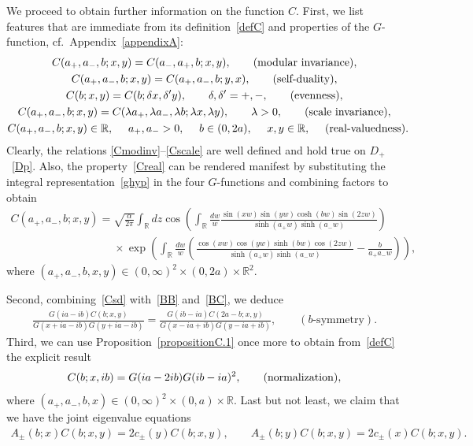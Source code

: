 \documentclass[11pt]{article}
\numberwithin{equation}{section}
\newcommand{\de}{\delta}
\newcommand{\R}{{\mathbb R}}
\newcommand{\aaa}{a_{+},a_{-}}
\begin{document}
We proceed to obtain further information on the function $C$. First, we list features that are immediate from its def\/inition~\eqref{defC} and properties of the $G$-function, cf.~Appendix~\ref{appendixA}:
\begin{gather}\label{Cmodinv}
C(a_{+},a_{-},b;x,y)=C(a_{-},a_{+},b;x,y),\qquad  ({\rm modular\  invariance}),
\\
\label{Csd}
C(a_{+},a_{-},b;x,y)=C(a_{+},a_{-},b;y,x),\qquad  (\mbox{self-duality}),
\\
\label{Ceven}
C(b;x,y)=C(b;\de x, \de'y),\qquad \de,\de'=+,-,\qquad ({\rm evenness}),
\\
\label{Cscale}
C(\aaa,b;x,y)=C(\lambda  a_{+},\lambda a_{-}, \lambda b;\lambda x,\lambda y),\qquad \lambda>0,\qquad ({\rm scale\ invariance}),
\\
\label{Creal}
C(\aaa,b;x,y)\in\R,\!\!\!\!\qquad  \aaa>0,\!\!\!\!\qquad b\in(0,2a),\!\!\!\!\qquad x,y\in\R,\!\!\!\!\qquad \mbox{(real-valuedness)}.\!\!\!\!
\end{gather}
Clearly, the relations \eqref{Cmodinv}--\eqref{Cscale} are well def\/ined and hold true on $D_+$~\eqref{Dp}.  Also, the property~\eqref{Creal} can be rendered manifest by substituting the integral representation~\eqref{ghyp} in the four $G$-functions and combining factors to obtain
\begin{gather}
C(\aaa,b;x,y)=  \sqrt{\frac{\alpha}{2\pi}}  \int_{\R}dz\cos\left( \int_{\R}\frac{dw}{w}\frac{\sin(xw)\sin(yw)\cosh(bw)\sin(2zw)}{\sinh(a_{+}w)\sinh(a_-w)}\right)  \\
\phantom{C(\aaa,b;x,y)=}{}  \times \exp\left( \int_{\R}\frac{dw}{w}\left(\frac{\cos(xw)\cos(yw)\sinh(bw)\cos(2zw)}{\sinh(a_{+}w)\sinh(a_-w)}-\frac{b}{a_+a_-w}\right)\right),  \nonumber
\end{gather}
  where $(\aaa,b,x,y)\in(0,\infty)^2\times(0,2a)\times\R^2$.

Second, combining~\eqref{Csd} with~\eqref{BB} and~\eqref{BC}, we deduce
\begin{gather}\label{Cbsym}
\frac{G(ia-ib)C(b;x,y)}{G(x+ia-ib)G(y+ia-ib)}=
\frac{G(ib-ia)C(2a-b;x,y)}{G(x-ia+ib)G(y-ia+ib)},\qquad (b\mbox{-symmetry}).
\end{gather}
Third, we can use Proposition~\ref{propositionC.1} once more to obtain from~\eqref{defC} the explicit result
\begin{gather}\label{Cnorm}
C(b;x,ib)=G(ia-2ib)G(ib-ia)^2,\qquad ({\rm normalization}),
\end{gather}
where $(\aaa,b,x)\in(0,\infty)^2\times (0,a)\times \R$.
Last but not least, we claim that we have the joint eigenvalue equations
\begin{gather}\label{Cades}
A_{\pm}(b;x)C(b;x,y)=2c_{\pm}(y)C(b;x,y),\qquad A_{\pm}(b;y)C(b;x,y)=2c_{\pm}( x)C(b;x,y).
\end{gather}
\end{document}
